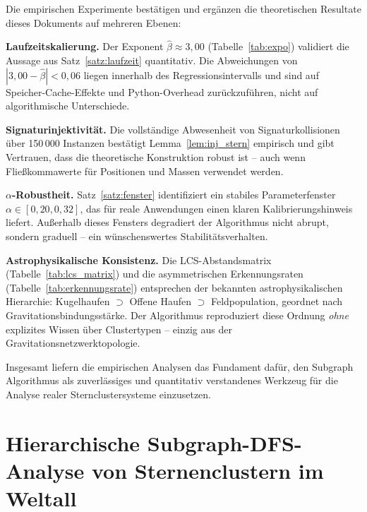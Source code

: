 ﻿\documentclass[a4paper,12pt]{report}
\theoremstyle{definition}
\begin{document}
Die empirischen Experimente bestätigen und ergänzen die theoretischen Resultate dieses Dokuments auf mehreren Ebenen:

\textbf{Laufzeitskalierung.} Der Exponent $\hat{\beta} \approx 3{,}00$ (Tabelle~\ref{tab:expo}) validiert die Aussage aus Satz~\ref{satz:laufzeit} quantitativ. Die Abweichungen von $|3{,}00 - \hat{\beta}| < 0{,}06$ liegen innerhalb des Regressionsintervalls und sind auf Speicher-Cache-Effekte und Python-Overhead zurückzuführen, nicht auf algorithmische Unterschiede.

\textbf{Signaturinjektivität.} Die vollständige Abwesenheit von Signaturkollisionen über 150\,000 Instanzen bestätigt Lemma~\ref{lem:inj_stern} empirisch und gibt Vertrauen, dass die theoretische Konstruktion robust ist -- auch wenn Fließkommawerte für Positionen und Massen verwendet werden.

\textbf{$\alpha$-Robustheit.} Satz~\ref{satz:fenster} identifiziert ein stabiles Parameterfenster $\alpha \in [0{,}20, 0{,}32]$, das für reale Anwendungen einen klaren Kalibrierungshinweis liefert. Außerhalb dieses Fensters degradiert der Algorithmus nicht abrupt, sondern graduell -- ein wünschenswertes Stabilitätsverhalten.

\textbf{Astrophysikalische Konsistenz.} Die LCS-Abstandsmatrix (Tabelle~\ref{tab:lcs_matrix}) und die asymmetrischen Erkennungsraten (Tabelle~\ref{tab:erkennungsrate}) entsprechen der bekannten astrophysikalischen Hierarchie: Kugelhaufen $\supset$ Offene Haufen $\supset$ Feldpopulation, geordnet nach Gravitationsbindungsstärke. Der Algorithmus reproduziert diese Ordnung \emph{ohne} explizites Wissen über Clustertypen -- einzig aus der Gravitationsnetzwerktopologie.

Insgesamt liefern die empirischen Analysen das Fundament dafür, den Subgraph Algorithmus als zuverlässiges und quantitativ verstandenes Werkzeug für die Analyse realer Sternclustersysteme einzusetzen.

\chapter{Hierarchische Subgraph-DFS-Analyse von Sternenclustern im Weltall}
\label{sec:hsdfs_sterne}
\end{document}
